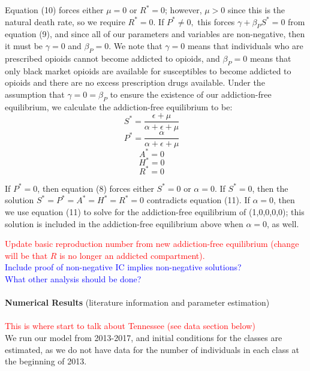 \documentclass[12pt]{article}
\begin{document}
Equation (10) forces either $\mu=0$ or $R^*=0$; however, $\mu > 0$ since this is the natural death rate, so we require $R^*=0$. If $P^* \neq 0, $ this forces $\gamma + \beta_{P} S^* =0$ from equation (9), and since all of our parameters and variables are non-negative, then it must be $\gamma=0$ and $\beta_{P}=0$. We note that $\gamma=0$ means that individuals who are prescribed opioids cannot become addicted to opioids, and $\beta_{P}=0$ means that only black market opioids are available for susceptibles to become addicted to opioids and there are no excess prescription drugs available. Under the assumption that $\gamma=0=\beta_{P}$ to ensure the existence of our addiction-free equilibrium, we calculate the addiction-free equilibrium to be: \\

\[S^*=\frac{\epsilon + \mu}{\alpha + \epsilon +\mu}\quad\]
\[P^*=\frac{\alpha}{\alpha + \epsilon +\mu}\quad\]
\[A^*=0\quad\]
\[H^*=0\quad\]
\[R^*=0\quad\] 

If $P^*=0$, then equation (8) forces either $S^*=0$ or $\alpha=0$.  If $S^*=0$, then the solution  $S^*=P^*=A^*=H^*=R^*=0$ contradicts equation (11). If $\alpha=0$, then we use equation (11) to solve for the addiction-free equilibrium of (1,0,0,0,0); this solution is included in the addiction-free equilibrium above when $\alpha=0$, as well. 

\textcolor{red}{Update basic reproduction number from new addiction-free equilibrium (change will be that $R$ is no longer an addicted compartment).} \\  
\textcolor{blue}{Include proof of non-negative IC implies non-negative solutions?} \\ 
\textcolor{blue}{What other analysis should be done?} \\ \\

\textbf{Numerical Results} 
(literature information and parameter estimation) \\ \\
\textcolor{red}{This is where start to talk about Tennessee (see data section below)} \\
We run our model from 2013-2017, and initial conditions for the classes are estimated, as we do not have data for the number of individuals in each class at the beginning of 2013. 
\end{document}
